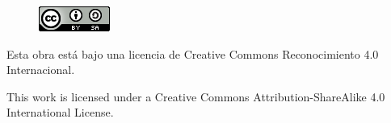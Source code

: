 \pagestyle{empty}  %

\null\vfil
\vskip 60pt
\begin{center}{
\begin{figure}[!ht]
  \centering
    \includegraphics[]{Images/cc}
\end{figure}
Esta obra está bajo una licencia de Creative
Commons Reconocimiento 4.0 Internacional.

This work is licensed under a Creative Commons Attribution-ShareAlike 4.0 International License.
}\end{center}
\vfil\null
\cleardoublepage

\clearpage  %